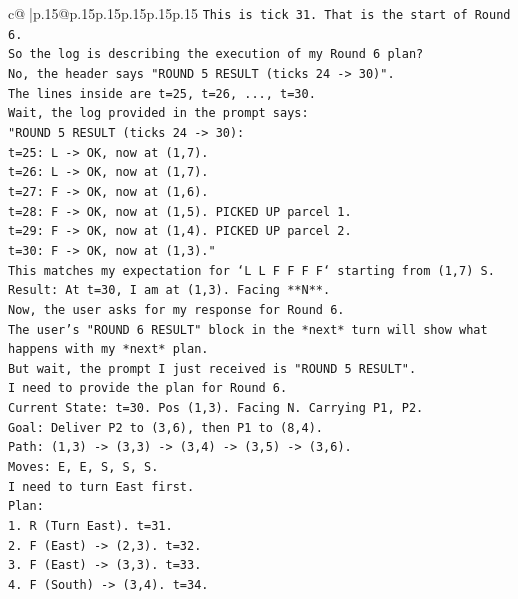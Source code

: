 \documentclass{article}
\begin{document}
{\begin{supertabular}{c@{$\;$}|p{.15\linewidth}@{}p{.15\linewidth}p{.15\linewidth}p{.15\linewidth}p{.15\linewidth}p{.15\linewidth}}
{{{\texttt{This is tick 31. That is the start of Round 6.} \\
\texttt{So the log is describing the execution of my Round 6 plan?} \\
\texttt{No, the header says "ROUND 5 RESULT (ticks 24 {-}> 30)".} \\
\texttt{The lines inside are t=25, t=26, ..., t=30.} \\
\texttt{Wait, the log provided in the prompt says:} \\
\texttt{"ROUND 5 RESULT (ticks 24 {-}> 30):} \\
\texttt{t=25: L {-}> OK, now at (1,7).} \\
\texttt{t=26: L {-}> OK, now at (1,7).} \\
\texttt{t=27: F {-}> OK, now at (1,6).} \\
\texttt{t=28: F {-}> OK, now at (1,5). PICKED UP parcel 1.} \\
\texttt{t=29: F {-}> OK, now at (1,4). PICKED UP parcel 2.} \\
\texttt{t=30: F {-}> OK, now at (1,3)."} \\
\texttt{This matches my expectation for `L L F F F F` starting from (1,7) S.} \\
\texttt{Result: At t=30, I am at (1,3). Facing **N**.} \\
\texttt{Now, the user asks for my response for Round 6.} \\
\texttt{The user's "ROUND 6 RESULT" block in the *next* turn will show what happens with my *next* plan.} \\
\texttt{But wait, the prompt I just received is "ROUND 5 RESULT".} \\
\texttt{I need to provide the plan for Round 6.} \\
\texttt{Current State: t=30. Pos (1,3). Facing N. Carrying P1, P2.} \\
\texttt{Goal: Deliver P2 to (3,6), then P1 to (8,4).} \\
\texttt{Path: (1,3) {-}> (3,3) {-}> (3,4) {-}> (3,5) {-}> (3,6).} \\
\texttt{Moves: E, E, S, S, S.} \\
\texttt{I need to turn East first.} \\
\texttt{Plan:} \\
\texttt{1. R (Turn East). t=31.} \\
\texttt{2. F (East) {-}> (2,3). t=32.} \\
\texttt{3. F (East) {-}> (3,3). t=33.} \\
\texttt{4. F (South) {-}> (3,4). t=34.} \\
}}}
\end{supertabular}}
\end{document}
